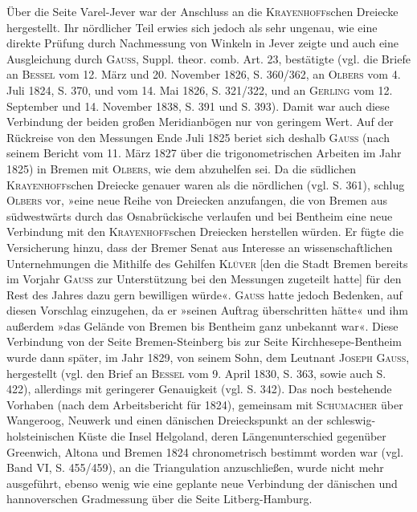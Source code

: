 \par\noindent\hspace*{\parindent}Über die Seite Varel-Jever war der Anschluss an die \textsc{Krayenhoff}schen Dreiecke hergestellt. Ihr nördlicher Teil erwies sich jedoch als sehr ungenau, wie eine direkte Prüfung durch Nachmessung von Winkeln in Jever zeigte und auch eine Ausgleichung durch \textsc{Gauss}, Suppl. theor. comb. Art. 23, bestätigte (vgl. die Briefe an \textsc{Bessel} vom 12. März und 20. November 1826, S. 360/362, an \textsc{Olbers} vom 4. Juli 1824, S. 370, und vom 14. Mai 1826, S. 321/322, und an \textsc{Gerling} vom 12. September und 14. November 1838, S. 391 und S. 393). Damit war auch diese Verbindung der beiden großen Meridianbögen nur von geringem Wert. Auf der Rückreise von den Messungen Ende Juli 1825 beriet sich deshalb \textsc{Gauss} (nach seinem Bericht vom 11. März 1827 über die trigonometrischen Arbeiten im Jahr 1825) in Bremen mit \textsc{Olbers}, wie dem abzuhelfen sei. Da die südlichen \textsc{Krayenhoff}schen Dreiecke genauer waren als die nördlichen (vgl. S. 361), schlug \textsc{Olbers} vor, »eine neue Reihe von Dreiecken anzufangen, die von Bremen aus südwestwärts durch das Osnabrückische verlaufen und bei Bentheim eine neue Verbindung mit den \textsc{Krayenhoff}schen Dreiecken herstellen würden. Er fügte die Versicherung hinzu, dass der Bremer Senat aus Interesse an wissenschaftlichen Unternehmungen die Mithilfe des Gehilfen \textsc{Klüver} [den die Stadt Bremen bereits im Vorjahr \textsc{Gauss} zur Unterstützung bei den Messungen zugeteilt hatte] für den Rest des Jahres dazu gern bewilligen würde«. \textsc{Gauss} hatte jedoch Bedenken, auf diesen Vorschlag einzugehen, da er »seinen Auftrag überschritten hätte« und ihm außerdem »das Gelände von Bremen bis Bentheim ganz unbekannt war«. Diese Verbindung von der Seite Bremen-Steinberg bis zur Seite Kirchhesepe-Bentheim wurde dann später, im Jahr 1829, von seinem Sohn, dem Leutnant \textsc{Joseph Gauss}, hergestellt (vgl. den Brief an \textsc{Bessel} vom 9. April 1830, S. 363, sowie auch S. 422), allerdings mit geringerer Genauigkeit (vgl. S. 342). Das noch bestehende Vorhaben (nach dem Arbeitsbericht für 1824), gemeinsam mit \textsc{Schumacher} über Wangeroog, Neuwerk und einen dänischen Dreieckspunkt an der schleswig-holsteinischen Küste die Insel Helgoland, deren Längenunterschied gegenüber Greenwich, Altona und Bremen 1824 chronometrisch bestimmt worden war (vgl. Band VI, S. 455/459), an die Triangulation anzuschließen, wurde nicht mehr ausgeführt, ebenso wenig wie eine geplante neue Verbindung der dänischen und hannoverschen Gradmessung über die Seite Litberg-Hamburg.

